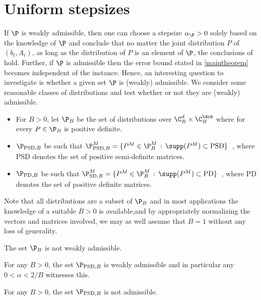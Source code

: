 \section{Uniform stepsizes}
If $\P$ is weakly admissible, then one can choose a stepsize $\alpha_{\P}>0$ solely based on the knowledge of $\P$ and
conclude that no matter the joint distribution $P$ of $(b_t,A_t)$, as long as the distribution of $P$ is an element of $\P$, the conclusions of  hold. Further, if $\P$ is admissible then the error bound stated in  \cref{maintheorem} becomes independent of the instance. Hence, an interesting question to investigate is whether a given set $\P$ is (weakly) admissible. We consider some reasonable classes of distributions and test whether or not they are (weakly) admissible.
\begin{definition}\label{def:pclass}
\begin{itemize}[leftmargin=*, before = \leavevmode\vspace{-\baselineskip}]
\item For $B>0$, let $\P_B$ be the set of distributions over $\C_B^{d}\times \C_B^{\dcd}$ where for every $P\in \P_B$ is positive definite.
\item  $\P_{\text{PSD},B}$ be such that  $\P^M_{\text{PSD},B}=\{ P^M \in \P^M_B \,:\,  \supp(P^M)\subset \text{PSD} \}\,$ , where PSD denotes the set of positive semi-definite matrices.
\item  $\P_{\text{PD},B}$ be such that  $\P^M_{\text{SD},B}=\{ P^M \in \P^M_B \,:\,  \supp(P^M)\subset \text{PD} \}\,$ , where PD denotes the set of positive definite matrices.
\end{itemize}
\end{definition}
Note that all distributions are a subset of $\P_B$ and in most applications the knowledge of a suitable $B>0$ is available,and by appropriately normalizing the vectors and matrices involved, we may as well assume that $B=1$ without any loss of generality.
\begin{proposition}\label{notwad}
The set $\P_B$ is not weakly admissible.
\end{proposition}
\begin{proposition}
For any $B>0$, the set $\P_{\text{PSD},B}$ is weakly admissible
and in particular any $0<\alpha < 2/B$ witnesses this.
\end{proposition}
\begin{proposition}
For any $B>0$, the set $\P_{\text{PSD},B}$ is not admissible.
\end{proposition}

